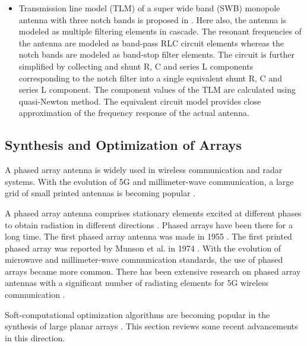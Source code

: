 \begin{itemize}
\item Transmission line model (TLM) of a super wide band (SWB) monopole antenna with three notch bands is proposed in \cite{optEqCkt_ads}. Here also, the antenna is modeled as multiple filtering elements in cascade. The resonant frequencies of the antenna are modeled as band-pass RLC circuit elements whereas the notch bands are modeled as band-stop filter elements. The circuit is further simplified by collecting and shunt R, C and series L components corresponding to the notch filter into a single equivalent shunt R, C and series L component. The component values of the TLM are calculated using quasi-Newton method. The equivalent circuit model provides close approximation of the frequency response of the actual antenna.
\end{itemize}

\subsection{Synthesis and Optimization of Arrays} \label{sec_lit_surv}

A phased array antenna is widely used in wireless communication and radar systems. With the evolution of 5G and millimeter-wave communication, a large grid of small printed antennas is becoming popular \cite{5gmmwave, 5gmmwave_fr4}.

A phased array antenna comprises stationary elements excited at different phases to obtain radiation in different directions \cite{phasedArrayHandbook}. Phased arrays have been there for a long time. The first phased array antenna was made in 1955 \cite{phasedArray_russia}. The first printed phased array was reported by Munson et al. in 1974 \cite{txmPhasedArray}. With the evolution of microwave and millimeter-wave communication standards, the use of phased arrays became more common. There has been extensive research on phased array antennas with a significant number of radiating elements for 5G wireless communication \cite{mmarrayRrev}.

Soft-computational optimization algorithms are becoming popular in the synthesis of large planar arrays \cite{arrayTradeoffs}. This section reviews some recent advancements in this direction.

